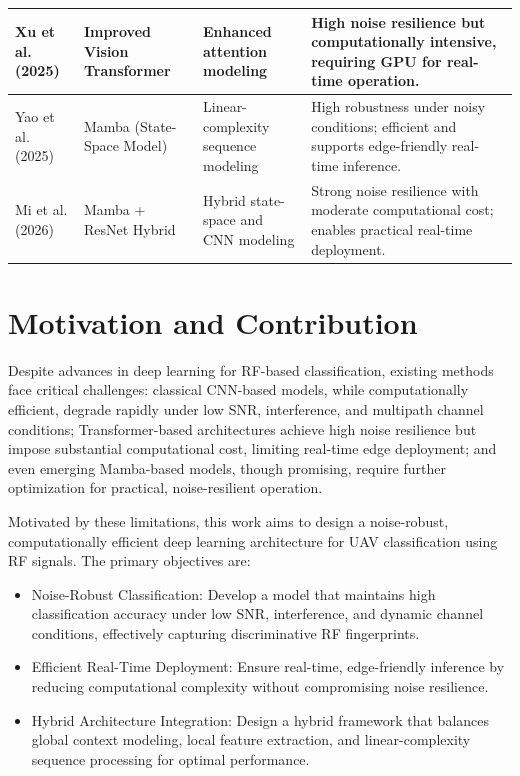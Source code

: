 \documentclass[runningheads]{llncs}
\begin{document}
\begin{table}[t]
{\begin{tabular}{|p{2.7cm}|p{2.3cm}|p{4cm}|p{7.5cm}|}
Xu et al. (2025) & Improved Vision Transformer & Enhanced attention modeling & High noise resilience but computationally intensive, requiring GPU for real-time operation. \\ \hline

Yao et al. (2025) & Mamba (State-Space Model) & Linear-complexity sequence modeling & High robustness under noisy conditions; efficient and supports edge-friendly real-time inference. \\ \hline

Mi et al. (2026) & Mamba + ResNet Hybrid & Hybrid state-space and CNN modeling & Strong noise resilience with moderate computational cost; enables practical real-time deployment. \\ \hline

\end{tabular}
}
\end{table}



\section{Motivation and Contribution}
Despite advances in deep learning for RF-based classification, existing methods face critical challenges: classical CNN-based models, while computationally efficient, degrade rapidly under low SNR, interference, and multipath channel conditions; Transformer-based architectures achieve high noise resilience but impose substantial computational cost, limiting real-time edge deployment; and even emerging Mamba-based models, though promising, require further optimization for practical, noise-resilient operation.

Motivated by these limitations, this work aims to design a noise-robust, computationally efficient deep learning architecture for UAV classification using RF signals. The primary objectives are:

\begin{itemize}
    \item Noise-Robust Classification: Develop a model that maintains high classification accuracy under low SNR, interference, and dynamic channel conditions, effectively capturing discriminative RF fingerprints.
    \item Efficient Real-Time Deployment: Ensure real-time, edge-friendly inference by reducing computational complexity without compromising noise resilience.
    \item Hybrid Architecture Integration: Design a hybrid framework that balances global context modeling, local feature extraction, and linear-complexity sequence processing for optimal performance.
\end{itemize}
\end{document}
